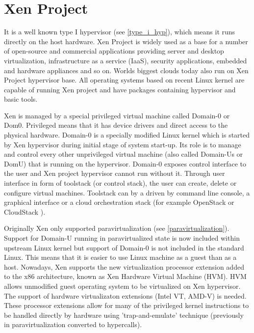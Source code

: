 \section{Xen Project \cite{xen_project}} 
\label{xen}
It is a well known type I hypervisor (see \ref{type_i_hyp}), which means it runs directly on the host hardware. Xen Project is widely used as a base for a number of open-source and commercial applications providing server and desktop virtualization, infrastructure as a service (IaaS), security applications, embedded and hardware appliances and so on. Worlds biggest clouds today also run on Xen Project hypervisor base. All operating systems based on recent Linux kernel are capable of running Xen project and have packages containing hypervisor and basic tools.

Xen is managed by a special privileged virtual machine called Domain-0 or Dom0. Privileged means that it has device drivers and direct access to the physical hardware. Domain-0 is a specially modified Linux kernel which is started by Xen hypervisor during initial stage of system start-up. Its role is to manage and control every other unprivileged virtual machine (also called Domain-Us or DomU) that is running on the hypervisor. Domain-0 exposes control interface to the user and Xen project hypervisor cannot run without it. Through user interface in form of toolstack (or control stack), the user can create, delete or configure virtual machines. Toolstack can by a driven by command line console, a graphical interface or a cloud orchestration stack (for example OpenStack \cite{open_stack} or CloudStack \cite{apache_cloud_stack}).

Originally Xen only supported paravirtualization (see \ref{paravirtualization}). Support for Domain-U running in paravirtualized state is now included within upstream Linux kernel but support of Domain-0 is not included in the standard Linux. This means that it is easier to use Linux machine as a guest than as a host. Nowadays, Xen supports the new virtualization processor extension added to the x86 architecture, known as Xen Hardware Virtual Machine (HVM). HVM allows unmodified guest operating system to be virtualized on Xen hypervisor. The support of hardware virtualizaton extensions (Intel VT, AMD-V) is needed. These processor extensions allow for many of the privileged kernel instructions to be handled directly by hardware using 'trap-and-emulate' technique (previously in paravirtualization converted to hypercalls).

